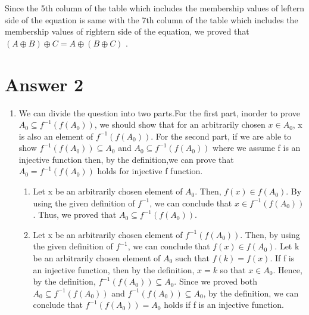 \documentclass[11pt]{article}
\begin{document}
\begin{enumerate}
\begin{enumerate}
\begin{table}[H]
\begin{tabular}{|c|c|c|c|c|c|c|}
			
		\end{tabular}
	\end{table}  
	
	Since the 5th column of the table which includes the membership values of leftern side of the equation is same with the 7th column of the table which includes the membership values of rightern side of the equation, we proved that $(A \oplus B)\oplus C = A \oplus (B \oplus C)$ .
	
\end{enumerate}

\end{enumerate}

\section*{Answer 2}
\begin{enumerate}
	\item 
	We can divide the question into two parts.For the first part, inorder to prove $A_{0} \subseteq f^{-1}(f(A_{0}))$, we should show that for an arbitrarily chosen $x \in A_{0}$, x is also an element of $f^{-1}(f(A_{0}))$. For the second part, if we are able to show $f^{-1}(f(A_{0})) \subseteq A_{0}$ and $A_{0} \subseteq f^{-1}(f(A_{0}))$ where we assume f is an injective function then, by the definition,we can prove that $A_{0} = f^{-1}(f(A_{0}))$ holds for injective f function.
	\renewcommand{\theenumii}{\roman{enumii}}
	\begin{enumerate}
		\item 
		Let x be an arbitrarily chosen element of $A_{0}$. Then, $f(x) \in f(A_{0})$. By using the given definition of $f^{-1}$, we can conclude that $x \in f^{-1}(f(A_{0}))$. Thus, we proved that
		$A_{0} \subseteq f^{-1}(f(A_{0}))$.
		\item
		Let x be an arbitrarily chosen element of $f^{-1}(f(A_{0}))$. Then, by using the given definition of $f^{-1}$, we can conclude that $f(x) \in f(A_{0})$. Let k be an arbitrarily chosen element of $A_{0}$ such that $f(k) = f(x)$. If f is an injective function, then by the definition, $x = k$ so that $x \in A_{0}$. Hence, by the definition, $f^{-1}(f(A_{0})) \subseteq A_{0}$. Since we proved both $A_{0} \subseteq f^{-1}(f(A_{0}))$ and $f^{-1}(f(A_{0})) \subseteq A_{0}$, by the definition, we can conclude that $f^{-1}(f(A_{0})) = A_{0}$ holds if f is an injective function.
	\end{enumerate}
	

\end{enumerate}
\end{document}
